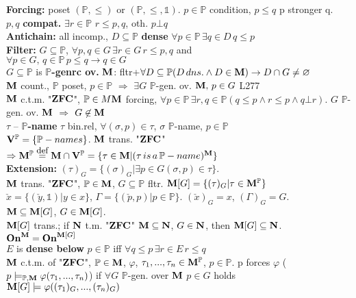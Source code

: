 \documentclass[9pt]{article}
\newcommand{\class}[1]{{\bf #1}}
\newcommand{\Pp}{\mathbb{P}}
\newcommand{\eqdef}{\overset{\mbox{\small{def}}}{=}}
\newcommand{\On}{\class{On}}
\newcommand{\V}{\class{V}}
\begin{document}
\begin{multicols*}{2}
{\bf Forcing:} poset $(\mathbb{P}, \leqslant)$ or $(\mathbb{P}, \leqslant,\mathbb{1})$. $p\in \Pp$ condition, $p\leqslant q$ p stronger q.\\
$p,q$ {\bf compat.} $\exists r\in \Pp$ $r\leqslant p, q$, oth. $p\bot q$\\
{\bf Antichain:} all incomp., $D\subseteq \Pp$ {\bf dense} $\forall p\in\Pp\,\exists q\in D\, q\leqslant p$\\
{\bf Filter:} $G\subseteq \Pp$, $\forall p, q\in G\,\exists r\in G\, r\leqslant p, q$ and\\ $\forall p\in G,\,q\in \Pp\,p\leqslant q\rightarrow q\in G$\\
$G\subseteq \Pp$ is {\bf $\Pp$-genrc ov.} $\class{M}$: fltr+$\forall D\subseteq \Pp (D\,dns.\wedge D\in\class{M})\rightarrow D\cap G\neq \varnothing$\\
$\class{M}$ count., $\Pp$ poset, $p\in \Pp$ $\Rightarrow$ $\exists G$ $\Pp$-gen. ov. $\class{M},\,p\in G$ L277\\
$\class{M}$ c.t.m. "$\class{ZFC}$", $\Pp\in M\class{M}$ forcing, $\forall p\in\Pp\,\exists r,q\in\Pp (q\leqslant p\wedge r\leqslant p\wedge q\bot r)$. $G$ $\Pp$-gen. ov. $\class{M}$ $\Rightarrow$ $G\not\in\class{M}$\\
$\tau$ -- {\bf $\Pp$-name} $\tau$ bin.rel, $\forall (\sigma,p)\in\tau$, $\sigma$ $\Pp$-name, $p\in\Pp$\\
$\V^\Pp=\{\Pp-names\}$. $\class{M}$ trans. "$\class{ZFC}$" $\Rightarrow \class{M}^\Pp\eqdef \class{M}\cap\V^\Pp=\{\tau\in\class{M}|(\tau\,is\,a\,\Pp-name)^\class{M}\}$\\
{\bf Extension:} $(\tau)_G=\{(\sigma)_G|\exists p\in G(\sigma,p)\in\tau\}$.\\
$\class{M}$ trans. "$\class{ZFC}$", $\Pp\in\class{M}$, $G\subseteq \Pp$ fltr. $\class{M}[G]=\{(\tau)_G|\tau\in\class{M}^\Pp\}$\\
$\check{x}=\{(\check{y},\mathbb{1})|y\in x\}$, $\Gamma=\{(\check{p},p)|p\in\Pp\}$. $(\check{x})_G=x$, $(\Gamma)_G=G$.\\
$\class{M}\subseteq\class{M}[G]$, $G\in\class{M}[G]$.\\
$\class{M}[G]$ trans.; if $\class{N}$ t.m. "$\class{ZFC}$" $\class{M}\subseteq\class{N}$, $G\in\class{N}$, then $\class{M}[G]\subseteq \class{N}$. $\On^\class{M}=\On^{\class{M}[G]}$\\
$E$ is {\bf dense below} $p\in\Pp$ iff $\forall q\leqslant p\,\exists r\in E\,r\leqslant q$\\
$\class{M}$ c.t.m. of "$\class{ZFC}$", $\Pp\in\class{M}$, $\varphi$, $\tau_1,...,\tau_n\in\class{M}^\Pp$, $p\in\Pp$. p forces $\varphi$ ($p\models_{\Pp,\class{M}}\varphi(\tau_1,...,\tau_n)$) if $\forall G$ $\Pp$-gen. over $\class{M}$ $p\in G$ holds $\class{M}[G]\models\varphi((\tau_1)_G,...,(\tau_n)_G)$\\

\end{multicols*}
\end{document}
